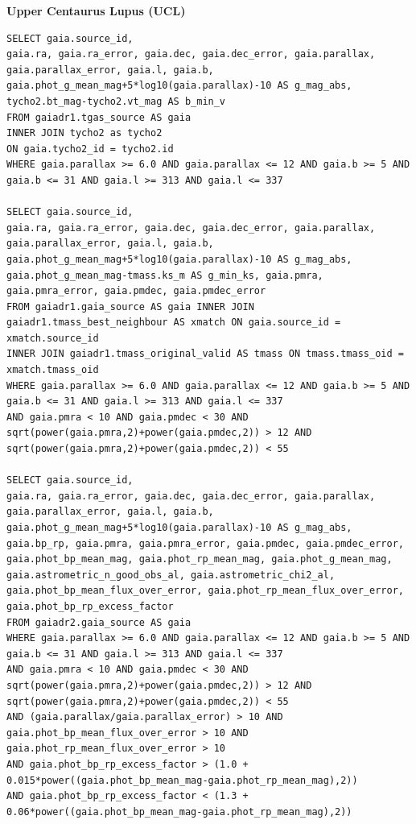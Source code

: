 \textbf{Upper Centaurus Lupus (UCL)}
\begin{lstlisting}[frame = single]
SELECT gaia.source_id, 
gaia.ra, gaia.ra_error, gaia.dec, gaia.dec_error, gaia.parallax, gaia.parallax_error, gaia.l, gaia.b,
gaia.phot_g_mean_mag+5*log10(gaia.parallax)-10 AS g_mag_abs,
tycho2.bt_mag-tycho2.vt_mag AS b_min_v
FROM gaiadr1.tgas_source AS gaia
INNER JOIN tycho2 as tycho2
ON gaia.tycho2_id = tycho2.id
WHERE gaia.parallax >= 6.0 AND gaia.parallax <= 12 AND gaia.b >= 5 AND gaia.b <= 31 AND gaia.l >= 313 AND gaia.l <= 337

SELECT gaia.source_id, 
gaia.ra, gaia.ra_error, gaia.dec, gaia.dec_error, gaia.parallax, gaia.parallax_error, gaia.l, gaia.b, 
gaia.phot_g_mean_mag+5*log10(gaia.parallax)-10 AS g_mag_abs, 
gaia.phot_g_mean_mag-tmass.ks_m AS g_min_ks, gaia.pmra, gaia.pmra_error, gaia.pmdec, gaia.pmdec_error 
FROM gaiadr1.gaia_source AS gaia INNER JOIN gaiadr1.tmass_best_neighbour AS xmatch ON gaia.source_id = xmatch.source_id 
INNER JOIN gaiadr1.tmass_original_valid AS tmass ON tmass.tmass_oid = xmatch.tmass_oid 
WHERE gaia.parallax >= 6.0 AND gaia.parallax <= 12 AND gaia.b >= 5 AND gaia.b <= 31 AND gaia.l >= 313 AND gaia.l <= 337 
AND gaia.pmra < 10 AND gaia.pmdec < 30 AND sqrt(power(gaia.pmra,2)+power(gaia.pmdec,2)) > 12 AND sqrt(power(gaia.pmra,2)+power(gaia.pmdec,2)) < 55

SELECT gaia.source_id, 
gaia.ra, gaia.ra_error, gaia.dec, gaia.dec_error, gaia.parallax, gaia.parallax_error, gaia.l, gaia.b, 
gaia.phot_g_mean_mag+5*log10(gaia.parallax)-10 AS g_mag_abs,
gaia.bp_rp, gaia.pmra, gaia.pmra_error, gaia.pmdec, gaia.pmdec_error, gaia.phot_bp_mean_mag, gaia.phot_rp_mean_mag, gaia.phot_g_mean_mag, 
gaia.astrometric_n_good_obs_al, gaia.astrometric_chi2_al, gaia.phot_bp_mean_flux_over_error, gaia.phot_rp_mean_flux_over_error, 
gaia.phot_bp_rp_excess_factor 
FROM gaiadr2.gaia_source AS gaia 
WHERE gaia.parallax >= 6.0 AND gaia.parallax <= 12 AND gaia.b >= 5 AND gaia.b <= 31 AND gaia.l >= 313 AND gaia.l <= 337 
AND gaia.pmra < 10 AND gaia.pmdec < 30 AND sqrt(power(gaia.pmra,2)+power(gaia.pmdec,2)) > 12 AND sqrt(power(gaia.pmra,2)+power(gaia.pmdec,2)) < 55 
AND (gaia.parallax/gaia.parallax_error) > 10 AND gaia.phot_bp_mean_flux_over_error > 10 AND gaia.phot_rp_mean_flux_over_error > 10 
AND gaia.phot_bp_rp_excess_factor > (1.0 + 0.015*power((gaia.phot_bp_mean_mag-gaia.phot_rp_mean_mag),2)) 
AND gaia.phot_bp_rp_excess_factor < (1.3 + 0.06*power((gaia.phot_bp_mean_mag-gaia.phot_rp_mean_mag),2))

\end{lstlisting}\vspace{5mm}

